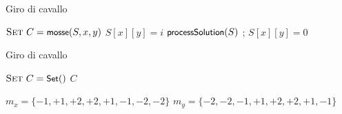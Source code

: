 \begin{frame}{Giro di cavallo}
	
\begin{Procedure}
\caption[A]{\BOOLEAN {}($\INTEGER[\,][\,]\ S$, \INTEGER $i$, \INTEGER $x$, \INTEGER $y$)}
$\textsc{Set}\ C = \textsf{{\small mosse}}(S, x, y)$\;
{
  $S[x][y] = i$\;
  {
    $\textsf{{\small processSolution}}(S)$\;
    \Return \TRUE\;
  }
  {
     \Return \TRUE;
  }
  $S[x][y] = 0$\;
}
\Return \FALSE\;
\end{Procedure}

\end{frame}

\begin{frame}{Giro di cavallo}

\begin{Procedure}
\caption[A]{\Set {}($\INTEGER[\,][\,]\ S$, \INTEGER $x$, \INTEGER $y$)}
$\textsc{Set}\ C = \textsf{{\small Set}}()$\;
\Return $C$\;
\end{Procedure}

\begin{Procedure}
	$m_x = \{ -1, +1, +2, +2, +1, -1, -2, -2 \}$\;
	$m_y = \{ -2, -2, -1, +1, +2, +2, +1, -1 \}$\;
\end{Procedure}

\end{frame}

